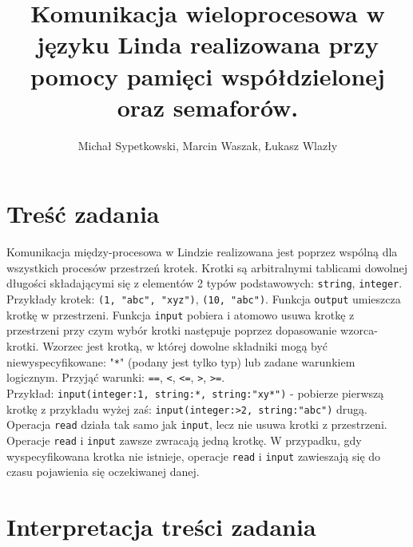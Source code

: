 \documentclass[a4paper]{article}
\title{Komunikacja wieloprocesowa w języku Linda realizowana przy pomocy pamięci współdzielonej oraz semaforów.}
\author{Michał Sypetkowski, Marcin Waszak, Łukasz Wlazły}
\date{}
\begin{document}
	\maketitle
	\newpage

	\section{Treść zadania}
	Komunikacja między-procesowa w Lindzie realizowana jest poprzez wspólną dla wszystkich procesów przestrzeń krotek.
    Krotki są arbitralnymi tablicami dowolnej długości składającymi się z elementów 2 typów podstawowych: \texttt{string}, \texttt{integer}.
    Przykłady krotek: \texttt{(1, "abc", "xyz")}, \texttt{(10, "abc")}.
    Funkcja \texttt{output} umieszcza krotkę w przestrzeni.
    Funkcja \texttt{input} pobiera i atomowo usuwa krotkę z przestrzeni przy czym wybór krotki następuje poprzez dopasowanie wzorca-krotki.
    Wzorzec jest krotką, w której dowolne składniki mogą być niewyspecyfikowane: "\texttt{*}" (podany jest tylko typ) lub zadane warunkiem logicznym. Przyjąć warunki: \texttt{==}, \texttt{<}, \texttt{<=}, \texttt{>}, \texttt{>=}. \\
    Przykład: \texttt{input(integer:1, string:*, string:"xy*")} - pobierze pierwszą krotkę z przykładu wyżej zaś: \texttt{input(integer:>2, string:"abc")} drugą.
    Operacja \texttt{read} działa tak samo jak \texttt{input}, lecz nie usuwa krotki z przestrzeni. Operacje \texttt{read} i \texttt{input} zawsze zwracają jedną krotkę.
    W przypadku, gdy wyspecyfikowana krotka nie istnieje, operacje \texttt{read} i \texttt{input} zawieszają się do czasu pojawienia się oczekiwanej danej.

	\section{Interpretacja treści zadania}
\end{document}
